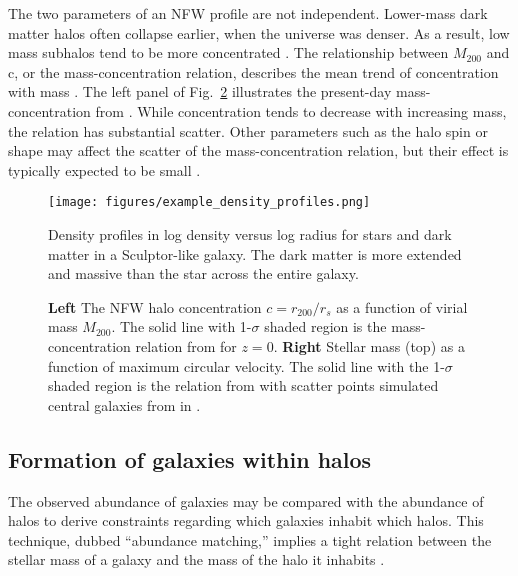 The two parameters of an NFW profile are not independent. Lower-mass
dark matter halos often collapse earlier, when the universe was denser.
As a result, low mass subhalos tend to be more concentrated
\citep[e.g.,][]{NFW1997}. The relationship between \(M_{200}\) and c, or
the mass-concentration relation, describes the mean trend of
concentration with mass \citep[e.g.,][]{bullock+2001, ludlow+2016}. The
left panel of Fig.~\ref{fig:smhm} illustrates the present-day
mass-concentration from \citet{ludlow+2016}. While concentration tends
to decrease with increasing mass, the relation has substantial scatter.
Other parameters such as the halo spin or shape may affect the scatter
of the mass-concentration relation, but their effect is typically
expected to be small
\citep{navarro+2010, dicintio+2013, dutton+maccio2014}.

\begin{figure}
\centering
\texttt{[image: figures/example\_density\_profiles.png]}
\caption[Example density profiles]{Density profiles in log density
versus log radius for stars and dark matter in a Sculptor-like galaxy.
The dark matter is more extended and massive than the star across the
entire galaxy.}\label{fig:nfw_density}
\end{figure}

\begin{figure}
\centering
{}
\caption[Stellar-mass halo-mass relation]{\textbf{Left} The NFW halo
concentration \(c=r_{200} / r_s\) as a function of virial mass
\(M_{200}\). The solid line with 1-\(\sigma\) shaded region is the
mass-concentration relation from \citet{ludlow+2016} for \(z=0\).
\textbf{Right} Stellar mass (top) as a function of maximum circular
velocity. The solid line with the 1-\(\sigma\) shaded region is the
relation from \citet{fattahi+2018} with scatter points simulated central
galaxies from \apostle{} in \citet{fattahi+2018}.}\label{fig:smhm}
\end{figure}

\subsection{\texorpdfstring{Formation of galaxies within \LCDM{}
halos}{Formation of galaxies within  halos}}\label{formation-of-galaxies-within-halos}

The observed abundance of galaxies may be compared with the abundance of
\LCDM{} halos to derive constraints regarding which galaxies inhabit
which halos. This technique, dubbed ``abundance matching,'' implies a
tight relation between the stellar mass of a galaxy and the mass of the
halo it inhabits \citep{li+white2009, moster+naab+white2013}.

